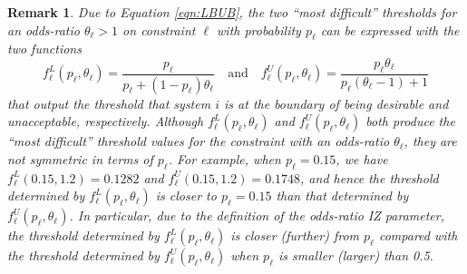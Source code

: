 \documentclass[11pt]{article}
\newtheorem{remark}{Remark}
\begin{document}
\vspace{-1.3cm}
\begin{remark}
\label{remark:SlippageConfig}
    Due to Equation \eqref{eqn:LBUB}, the two ``most difficult'' thresholds for an odds-ratio $\theta_\ell>1$ on constraint $\ell$ with probability $p_{\ell}$ can be expressed with the two functions 
    \begin{equation} 
\label{eqn:thresholds}
f_{\ell}^{L}(p_{\ell}, \theta_\ell) = \frac {p_{\ell}}{p_{\ell} + (1-p_{\ell})\theta_\ell} \quad \mbox{and} \quad f_{\ell}^{U}(p_{\ell}, \theta_\ell) = \frac{p_{\ell}\theta_\ell}{p_{\ell} (\theta_\ell-1) + 1}
\end{equation} 
that output the threshold that system $i$ is at the boundary of being desirable and unacceptable, respectively. Although $f_\ell^L(p_{\ell},\theta_\ell)$ and $f_\ell^U(p_{\ell},\theta_\ell)$ both produce the ``most difficult'' threshold values for the constraint with an odds-ratio $\theta_\ell$, they are not symmetric in terms of $p_{\ell}$. For example, when $p_{\ell}=0.15$, we have $f_\ell^L(0.15, 1.2)=0.1282$ and $f_\ell^U(0.15, 1.2)=0.1748$, and hence the threshold determined by $f_\ell^L(p_{\ell}, \theta_\ell)$ is closer to $p_{\ell}=0.15$ than that determined by $f_\ell^U(p_{\ell}, \theta_\ell)$. 
In particular, due to the definition of the odds-ratio IZ parameter, the threshold determined by $f_\ell^L(p_{\ell}, \theta_\ell)$ is closer (further) from $p_{\ell}$ compared with the threshold determined by $f_\ell^U(p_{\ell}, \theta_\ell)$ when $p_{\ell}$ is smaller (larger) than 0.5.
\end{remark}
\end{document}
